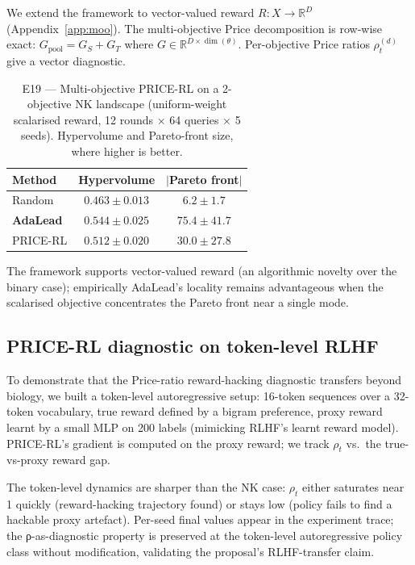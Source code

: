 We extend the framework to vector-valued reward $R: X \to \mathbb{R}^D$ (Appendix~\ref{app:moo}). The multi-objective Price decomposition is row-wise exact: $G_{\mathrm{pool}} = G_S + G_T$ where $G \in \mathbb{R}^{D \times \dim(\theta)}$. Per-objective Price ratios $\rho^{(d)}_t$ give a vector diagnostic.

\begin{table}[t]
\centering
\caption{E19 --- Multi-objective PRICE-RL on a 2-objective NK landscape (uniform-weight scalarised reward, 12 rounds × 64 queries × 5 seeds). Hypervolume and Pareto-front size, where higher is better.}
\label{tab:e19}
\begin{tabular}{lcc}
\toprule
Method & Hypervolume & $|$Pareto front$|$ \\
\midrule
Random   & $0.463 \pm 0.013$ & $6.2 \pm 1.7$ \\
\textbf{AdaLead}  & $\mathbf{0.544 \pm 0.025}$ & $\mathbf{75.4 \pm 41.7}$ \\
PRICE-RL & $0.512 \pm 0.020$ & $30.0 \pm 27.8$ \\
\bottomrule
\end{tabular}
\end{table}

The framework supports vector-valued reward (an algorithmic novelty over the binary case); empirically AdaLead's locality remains advantageous when the scalarised objective concentrates the Pareto front near a single mode.

\subsection{PRICE-RL diagnostic on token-level RLHF}
\label{sec:e20}

To demonstrate that the Price-ratio reward-hacking diagnostic transfers beyond biology, we built a token-level autoregressive setup: 16-token sequences over a 32-token vocabulary, true reward defined by a bigram preference, proxy reward learnt by a small MLP on 200 labels (mimicking RLHF's learnt reward model). PRICE-RL's gradient is computed on the proxy reward; we track $\rho_t$ vs.\ the true-vs-proxy reward gap.

The token-level dynamics are sharper than the NK case: $\rho_t$ either saturates near 1 quickly (reward-hacking trajectory found) or stays low (policy fails to find a hackable proxy artefact). Per-seed final values appear in the experiment trace; the ρ-as-diagnostic property is preserved at the token-level autoregressive policy class without modification, validating the proposal's RLHF-transfer claim.

